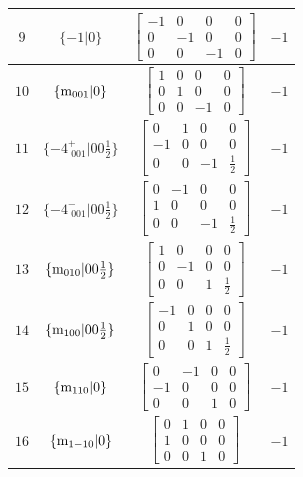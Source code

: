 \documentclass[fleqn,8pt]{jsarticle}
\begin{document}
\begin{longtable}{cccc}
$ 9 $ & $ \{-1|0\} $ & $ \begin{bmatrix} -1 & 0 & 0 & 0 \\ 0 & -1 & 0 & 0 \\ 0 & 0 & -1 & 0 \end{bmatrix} $ & $ -1 $ \\ \hline
$ 10 $ & $ \{{\rm m}_{001}|0\} $ & $ \begin{bmatrix} 1 & 0 & 0 & 0 \\ 0 & 1 & 0 & 0 \\ 0 & 0 & -1 & 0 \end{bmatrix} $ & $ -1 $ \\ \hline
$ 11 $ & $ \{-4^{+}_{\,\,001}|0 0 \frac{1}{2}\} $ & $ \begin{bmatrix} 0 & 1 & 0 & 0 \\ -1 & 0 & 0 & 0 \\ 0 & 0 & -1 & \frac{1}{2} \end{bmatrix} $ & $ -1 $ \\ \hline
$ 12 $ & $ \{-4^{-}_{\,\,001}|0 0 \frac{1}{2}\} $ & $ \begin{bmatrix} 0 & -1 & 0 & 0 \\ 1 & 0 & 0 & 0 \\ 0 & 0 & -1 & \frac{1}{2} \end{bmatrix} $ & $ -1 $ \\ \hline
$ 13 $ & $ \{{\rm m}_{010}|0 0 \frac{1}{2}\} $ & $ \begin{bmatrix} 1 & 0 & 0 & 0 \\ 0 & -1 & 0 & 0 \\ 0 & 0 & 1 & \frac{1}{2} \end{bmatrix} $ & $ -1 $ \\ \hline
$ 14 $ & $ \{{\rm m}_{100}|0 0 \frac{1}{2}\} $ & $ \begin{bmatrix} -1 & 0 & 0 & 0 \\ 0 & 1 & 0 & 0 \\ 0 & 0 & 1 & \frac{1}{2} \end{bmatrix} $ & $ -1 $ \\ \hline
$ 15 $ & $ \{{\rm m}_{110}|0\} $ & $ \begin{bmatrix} 0 & -1 & 0 & 0 \\ -1 & 0 & 0 & 0 \\ 0 & 0 & 1 & 0 \end{bmatrix} $ & $ -1 $ \\ \hline
$ 16 $ & $ \{{\rm m}_{1-10}|0\} $ & $ \begin{bmatrix} 0 & 1 & 0 & 0 \\ 1 & 0 & 0 & 0 \\ 0 & 0 & 1 & 0 \end{bmatrix} $ & $ -1 $ \\
\end{longtable}
\end{document}
